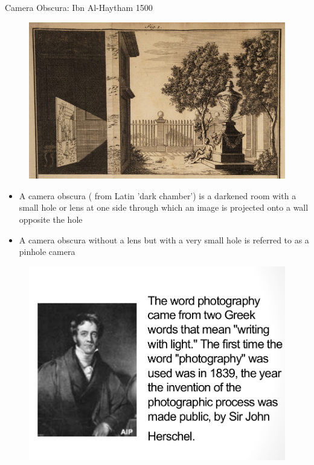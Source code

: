 \documentclass{beamer}
\begin{document}
\begin{frame}{Camera Obscura: Ibn Al-Haytham 1500}
	\begin{figure}
		\centering
		\includegraphics[scale=0.4]{61.jpg}
	\end{figure}
	\begin{itemize}
		\item A camera obscura ( from Latin 'dark chamber') is a darkened room with a small hole or lens at one side through which an image is projected onto a wall opposite the hole
		\item A camera obscura without a lens but with a very small hole is referred to as a pinhole camera
	\end{itemize}
\end{frame}

\begin{frame}
	\begin{figure}
		\centering
		\includegraphics[scale=0.4]{64.jpg}
	\end{figure}
\end{frame}
\end{document}
